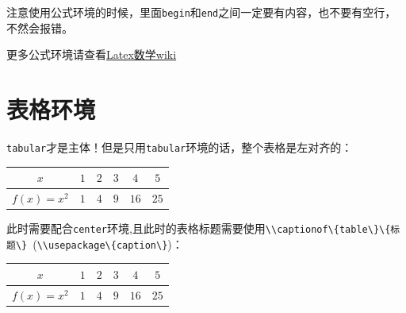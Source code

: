 \begin{remark}
    注意使用公式环境的时候，里面\textcolor{red!50!black}{\Verb"begin"}和\textcolor{red!50!black}{\Verb"end"}之间一定要有内容，也不要有空行，不然会报错。
\end{remark}
\begin{remark}
    更多公式环境请查看\href{https://en.wikibooks.org/wiki/LaTeX/Mathematics}{Latex数学wiki}
\end{remark}

\section{表格环境}
\textcolor{red!50!black}{\Verb"tabular"}才是主体！但是只用\textcolor{red!50!black}{\Verb"tabular"}环境的话，整个表格是左对齐的：

\begin{tabular}{c|c|c|c|c|c}
\hline
     $x$ & $1$ & $2$ & $3$ & $4$ & $5$ \\ \hline
     $f(x) = x^2$ & $1$ & $4$ & $9$ & $16$ & $25$\\ \hline
\end{tabular}

此时需要配合\textcolor{red!50!black}{\Verb"center"}环境,且此时的表格标题需要使用\textcolor{red!50!black}{\Verb"\\captionof\{table\}\{标题\}"}~(\textcolor{red!50!black}{\Verb"\\usepackage\{caption\}"})：
\begin{center}
\begin{tabular}{c|c|c|c|c|c}
\hline
     $x$ & $1$ & $2$ & $3$ & $4$ & $5$ \\ \hline
     $f(x) = x^2$ & $1$ & $4$ & $9$ & $16$ & $25$\\ \hline
\end{tabular}
\end{center}

